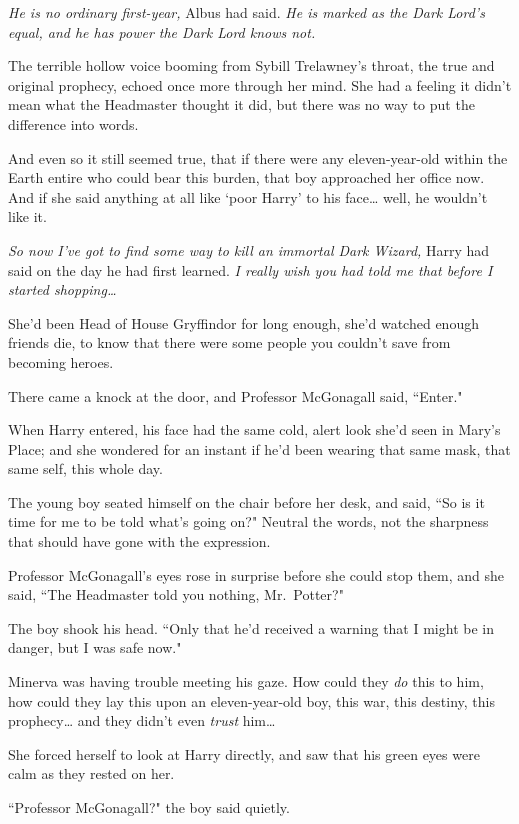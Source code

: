 \emph{He is no ordinary first-year,} Albus had said. \emph{He is marked as the Dark Lord's equal, and he has power the Dark Lord knows not.}

The terrible hollow voice booming from Sybill Trelawney's throat, the true and original prophecy, echoed once more through her mind. She had a feeling it didn't mean what the Headmaster thought it did, but there was no way to put the difference into words.

And even so it still seemed true, that if there were any eleven-year-old within the Earth entire who could bear this burden, that boy approached her office now. And if she said anything at all like `poor Harry' to his face{\ldots} well, he wouldn't like it.

\emph{So now I've got to find some way to kill an immortal Dark Wizard,} Harry had said on the day he had first learned. \emph{I really wish you had told me that before I started shopping{\ldots}}

She'd been Head of House Gryffindor for long enough, she'd watched enough friends die, to know that there were some people you couldn't save from becoming heroes.

There came a knock at the door, and Professor McGonagall said, ``Enter."

When Harry entered, his face had the same cold, alert look she'd seen in Mary's Place; and she wondered for an instant if he'd been wearing that same mask, that same self, this whole day.

The young boy seated himself on the chair before her desk, and said, ``So is it time for me to be told what's going on?" Neutral the words, not the sharpness that should have gone with the expression.

Professor McGonagall's eyes rose in surprise before she could stop them, and she said, ``The Headmaster told you nothing, Mr.~Potter?"

The boy shook his head. ``Only that he'd received a warning that I might be in danger, but I was safe now."

Minerva was having trouble meeting his gaze. How could they \emph{do} this to him, how could they lay this upon an eleven-year-old boy, this war, this destiny, this prophecy{\ldots} and they didn't even \emph{trust} him{\ldots}

She forced herself to look at Harry directly, and saw that his green eyes were calm as they rested on her.

``Professor McGonagall?" the boy said quietly.

